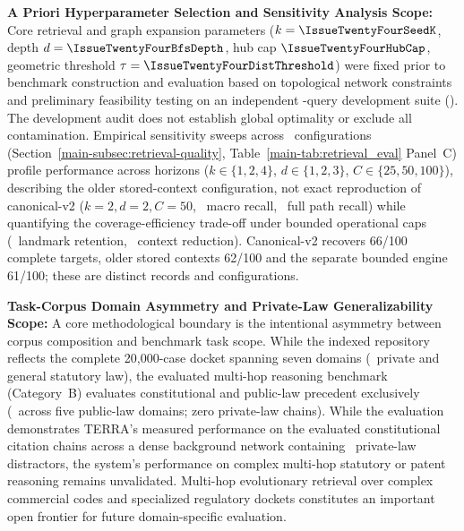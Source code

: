 \item \textbf{A Priori Hyperparameter Selection and Sensitivity Analysis Scope:} Core retrieval and graph expansion parameters ($k=\IssueTwentyFourSeedK$, depth $d=\IssueTwentyFourBfsDepth$, hub cap $\IssueTwentyFourHubCap$, geometric threshold $\tau=\IssueTwentyFourDistThreshold$) were fixed prior to benchmark construction and evaluation based on topological network constraints and preliminary feasibility testing on an independent \IssueTwentyFourDevQueryCount-query development suite (\IssueTwentyFourDevDate). The development audit does not establish global optimality or exclude all contamination. Empirical sensitivity sweeps across \IssueTwentySixConfigCount\ configurations (Section~\ref{main-subsec:retrieval-quality}, Table~\ref{main-tab:retrieval_eval} Panel~C) profile performance across horizons ($k \in \{1,2,4\}$, $d \in \{1,2,3\}$, $C \in \{25,50,100\}$), describing the older stored-context configuration, not exact reproduction of canonical-v2 ($k=2, d=2, C=50$, \IssueTwentySixHistMacro\ macro recall, \IssueTwentySixHistFullPath\ full path recall) while quantifying the coverage-efficiency trade-off under bounded operational caps (\IssueTwentySixGoldRetentionPct\ landmark retention, \IssueTwentySixContextReductionPct\ context reduction). Canonical-v2 recovers 66/100 complete targets, older stored contexts 62/100 and the separate bounded engine 61/100; these are distinct records and configurations.

\item \textbf{Task-Corpus Domain Asymmetry and Private-Law Generalizability Scope:} A core methodological boundary is the intentional asymmetry between corpus composition and benchmark task scope. While the indexed repository reflects the complete 20,000-case docket spanning seven domains (\IssueTwentyFiveCorpusCombinedPrivateStatutoryPct\ private and general statutory law), the evaluated multi-hop reasoning benchmark (Category~B) evaluates constitutional and public-law precedent exclusively (\IssueTwentyFiveCatBConstitutionalPublicPct\ across five public-law domains; zero private-law chains). While the evaluation demonstrates TERRA's measured performance on the evaluated constitutional citation chains across a dense background network containing \CorpusPrivateLawOpinions\ private-law distractors, the system's performance on complex multi-hop statutory or patent reasoning remains unvalidated. Multi-hop evolutionary retrieval over complex commercial codes and specialized regulatory dockets constitutes an important open frontier for future domain-specific evaluation.

